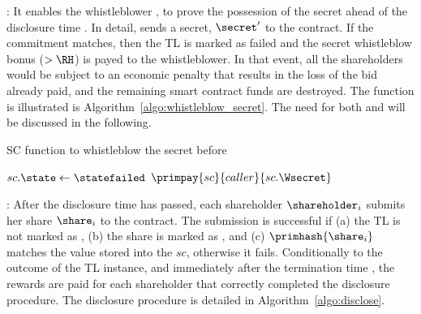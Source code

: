 \smallskip
\texttt{\algowhistleblowsecret}:
It enables the whistleblower \whistleblower, to prove the possession of the secret ahead of the disclosure time \td.
In detail, \whistleblower sends a secret, $\secret'$ to the contract.
If the commitment matches, then the TL is marked as failed and the secret whistleblow bonus \Wsecret ($>\RH$) is payed to the whistleblower.
In that event, all the shareholders would be subject to an economic penalty that results in the loss of the bid already paid, and the remaining smart contract funds are destroyed.
The function is illustrated is Algorithm~\ref{algo:whistleblow_secret}.
The need for both \texttt{\algowhistleblowshare} and \texttt{\algowhistleblowsecret} will be discussed in the following.

\begin{algorithm}[t]
	\caption{SC function to whistleblow the secret before \td}\label{algo:whistleblow_secret}
	\begin{algorithmic}[1]
		\vspace{0.6em}
		\State $sc.\state\gets \statefailed$
		\State $\primpay{sc}{caller}{sc.\Wsecret}$
		\EndIf
		\EndIf
		\EndProcedure
	\end{algorithmic}
\end{algorithm}


\smallskip
\texttt{\algodisclose}:
After the disclosure time \td has passed, each shareholder $\shareholder_{i}$ submits her share $\share_{i}$ to the contract.
The submission is successful if (a) the TL is not marked as \statefailed, (b) the share is marked as \statepaid, and (c) $\primhash{\share_i}$ matches the value stored into the $sc$, otherwise it fails.
Conditionally to the outcome of the TL instance, and immediately after the termination time \te, the rewards are paid for each shareholder that correctly completed the disclosure procedure.
The disclosure procedure is detailed in Algorithm~\ref{algo:disclose}.
